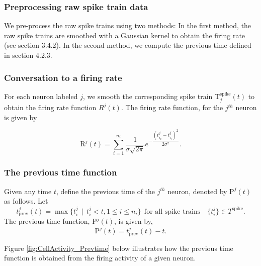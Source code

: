 \subsubsection{Preprocessing raw spike train data}
We pre-process the raw spike trains using two methods: In the first method, the raw spike trains are smoothed with a Gaussian kernel to obtain the firing rate (see section 3.4.2). In the second method, we compute the previous time defined in section 4.2.3.\\


\subsubsection{Conversation to a firing rate}
For each neuron labeled $j$,  we smooth the corresponding spike train T$^{\text{spike}}_{j}(t)$ to obtain the firing rate function $R^{j}(t).$ The  firing rate function, for the $j^{th}$ neuron is given by

\begin{equation} \label{jfirerate}
\text{R}^{j}(t) = \displaystyle \sum_{i=1}^{n_{i}}  \frac{1}{\sigma \sqrt{2\pi}} 
e^{-\dfrac{(t_{i_{k}}^{j}  - t_{i_{l}}^{j})^2}{2\sigma^2}}. 
\end{equation}

\subsubsection{The previous time function}
Given any time $t$, define the previous time of the $j^{th}$ neuron, denoted by $\text{P}^{j}(t)$ as follows. Let 
\[
t^{j}_{\text{prev}}(t) = \displaystyle \max  \{  t^{j}_{i} \ \ | \ \ t^{j}_{i} < t, 1 \leq i \leq n_{i} \} \ \ \text{for all spike trains} \quad  \{t^{j}_{i}\} \in T^{\text{spike}}.
\]
The previous time function, P$^{j}(t)$, is given by, 
\begin{equation}\label{prevtimefun}
\text{P}^{j}(t) = t^{j}_{\text{prev}}(t) - t.
\end{equation}


Figure \ref{fig:CellActivity_Prevtime} below illustrates how the previous time function is obtained from the firing activity of a given neuron.


